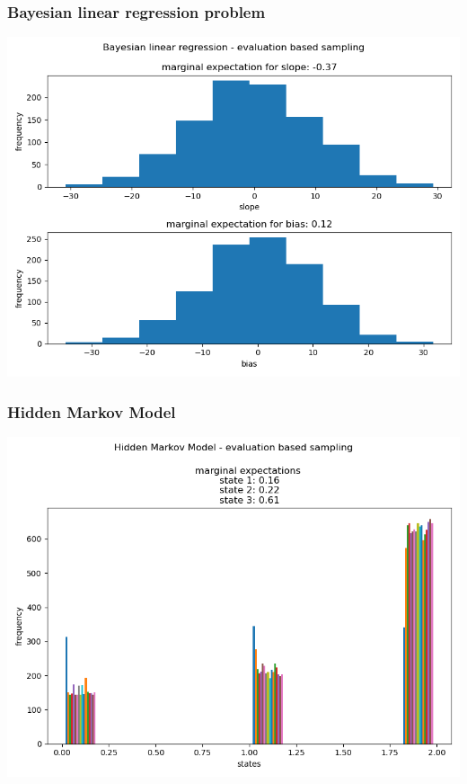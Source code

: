 \documentclass[10pt]{homeworg}
\begin{document}
\subsubsection{Bayesian linear regression problem}
\begin{center}
\includegraphics[scale=0.5]{figures/evaluation_2}
\end{center}

\subsubsection{Hidden Markov Model}
\begin{center}
\includegraphics[scale=0.5]{figures/evaluation_3}
\end{center}
\end{document}
